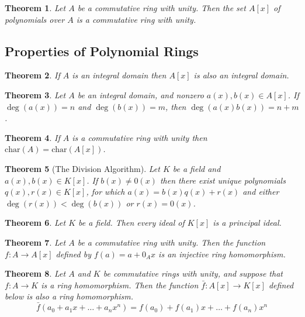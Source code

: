 \documentclass[letterpaper, 12pt]{article}
\renewcommand{\char}[1]{\text{char}(#1)}
\newtheorem{thm}{Theorem}
\begin{document}
			\begin{thm}
			Let $A$ be a commutative ring with unity. 
			Then the set $A[x]$ of polynomials over $A$ is a commutative ring with unity.
			\end{thm}

		\subsection{Properties of Polynomial Rings}
		\label{sub:properties_of_polynomial_rings}
			\setcounter{thm}{16}
			\begin{thm}
			If $A$ is an integral domain then $A[x]$ is also an integral domain.
			\end{thm}

			\setcounter{thm}{19}
			\begin{thm}
			Let $A$ be an \textit{integral domain}, and nonzero $a(x), b(x) \in A[x]$. 
			If $\deg(a(x)) = n$ and $\deg(b(x)) = m$, then $\deg(a(x)b(x)) = n + m$.
			\end{thm}

			\setcounter{thm}{21}
			\begin{thm}
			If $A$ is a commutative ring with unity then $\char{A} = \char{A[x]}$.
			\end{thm}

			\setcounter{thm}{23}
			\begin{thm}[The Division Algorithm]
			Let $K$ be a field and $a(x),b(x) \in K[x]$. 
			If $b(x) \neq 0(x)$ then there exist unique polynomials $q(x),r(x) \in K[x]$, for which $a(x) = b(x)q(x) + r(x)$ and either $\deg(r(x)) < \deg(b(x))$ or $r(x) = 0(x)$.
			\end{thm}

			\setcounter{thm}{25}
			\begin{thm}
			Let $K$ be a field. 
			Then every ideal of $K[x]$ is a principal ideal.
			\end{thm}

			\begin{thm}
			Let $A$ be a commutative ring with unity. 
			Then the function $f : A \to A[x]$ defined by $f(a) = a + 0_{A}x$ is an injective ring homomorphism.
			\end{thm}

			\begin{thm}
			Let $A$ and $K$ be commutative rings with unity, and suppose that $f : A \to K$ is a ring homomorphism. 
			Then the function $\bar{f} : A[x] \to K[x]$ defined below is also a ring homomorphism. $$\bar{f}(a_{0} + a_{1}x + \dots + a_{n}x^{n}) = f(a_{0}) + f(a_{1})x + \dots + f(a_{n})x^{n}$$
			\end{thm}
\end{document}
